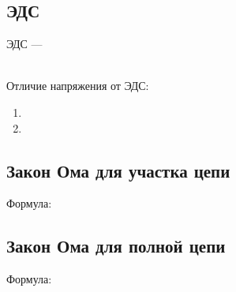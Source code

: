 \subsection{ЭДС}
ЭДС --- \hrulefill

\hrulefill
\\
Отличие напряжения от ЭДС:
\begin{enumerate}
    \item \hrulefill

    \hrulefill
    \item \hrulefill

    \hrulefill
\end{enumerate}

\newpage

\subsection{Закон Ома для участка цепи}

Формула:



\subsection{Закон Ома для полной цепи}

Формула:

